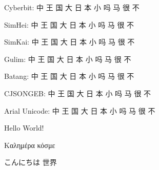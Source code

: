 \documentclass[twocolumn]{article}
\begin{document}
\begin{CJK*}{UTF8}{cyberb} \CJKtilde
Cyberbit: 中 王 国 大 日 本 小 吗 马 很 不
\end{CJK*}

\begin{CJK*}{UTF8}{simhei} \CJKtilde
SimHei: 中 王 国 大 日 本 小 吗 马 很 不
\end{CJK*}

\begin{CJK*}{UTF8}{SIMKAI} \CJKtilde
SimKai: 中 王 国 大 日 本 小 吗 马 很 不
\end{CJK*}

\begin{CJK*}{UTF8}{gulim} \CJKtilde
Gulim: 中 王 国 大 日 本 小 吗 马 很 不
\end{CJK*}

\begin{CJK*}{UTF8}{batang} \CJKtilde
Batang: 中 王 国 大 日 本 小 吗 马 很 不
\end{CJK*}

\begin{CJK*}{UTF8}{song} \CJKtilde
CJSONGEB: 中 王 国 大 日 本 小 吗 马 很 不
\end{CJK*}

\begin{CJK*}{UTF8}{arial} \CJKtilde
Arial Unicode: 中 王 国 大 日 本 小 吗 马 很 不
\end{CJK*}


\begin{CJK}{UTF8}{arial}

\noindent Hello World!

\noindent Καλημέρα κόσμε

\CJKnospace
\noindent こんにちは 世界

\end{CJK} 
\end{document}
